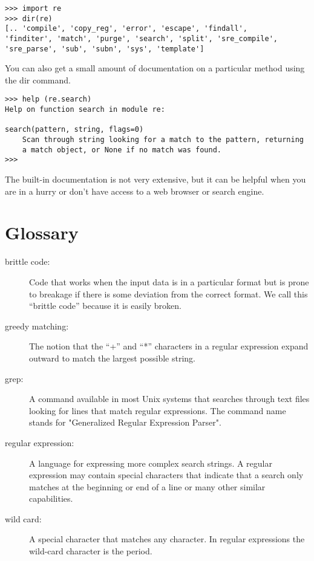 \beforeverb
\begin{verbatim}
>>> import re
>>> dir(re)
[.. 'compile', 'copy_reg', 'error', 'escape', 'findall',
'finditer', 'match', 'purge', 'search', 'split', 'sre_compile',
'sre_parse', 'sub', 'subn', 'sys', 'template']
\end{verbatim}
\afterverb
%
You can also get a small amount of documentation on a particular method using the dir command.

\beforeverb
\begin{verbatim}
>>> help (re.search)
Help on function search in module re:

search(pattern, string, flags=0)
    Scan through string looking for a match to the pattern, returning
    a match object, or None if no match was found.
>>>
\end{verbatim}
\afterverb
%
The built-in documentation is not very extensive, but it can be helpful when you are in a hurry
or don't have access to a web browser or search engine.

\section{Glossary}

\begin{description}

\item[brittle code:]
Code that works when the input data is in a particular format but is prone to breakage
if there is some deviation from the correct format.  We call this ``brittle code''
because it is easily broken.

\item[greedy matching:]
The notion that the ``+'' and ``*'' characters in a regular expression expand outward to
match the largest possible string.

\item[grep:]
A command available in most Unix systems that searches through text files looking for lines
that match regular expressions. The command name stands for "Generalized Regular Expression Parser".

\item[regular expression:]
A language for expressing more complex search strings.  A regular expression may contain
special characters that indicate that a search only matches at the beginning or end of a line
or many other similar capabilities.

\item[wild card:]
A special character that matches any character.  In regular expressions the wild-card
character is the period.

\end{description}

